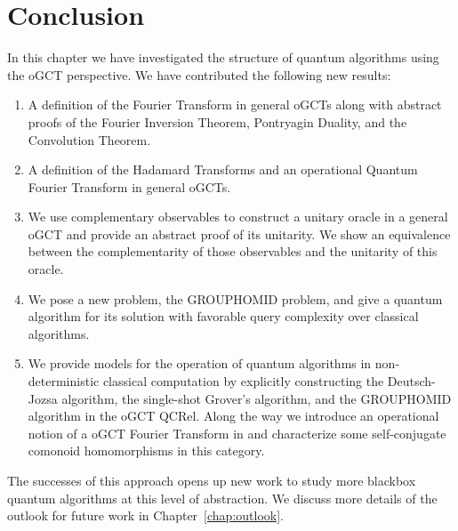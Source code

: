 \section{Conclusion}
In this chapter we have investigated the structure of quantum algorithms using the oGCT perspective. We have contributed the following new results:
\begin{enumerate}
\item A definition of the Fourier Transform in general oGCTs along with abstract proofs of the Fourier Inversion Theorem, Pontryagin Duality, and the Convolution Theorem.
\item A definition of the Hadamard Transforms and an operational Quantum Fourier Transform in general oGCTs.
\item We use complementary observables to construct a unitary oracle in a general oGCT and provide an abstract proof of its unitarity.  We show an equivalence between the complementarity of those observables and the unitarity of this oracle.
\item We pose a new problem, the GROUPHOMID problem, and give a quantum algorithm for its solution with favorable query complexity over classical algorithms.
\item We provide models for the operation of quantum algorithms in non-deterministic classical computation by explicitly constructing the Deutsch-Jozsa algorithm, the single-shot Grover's algorithm, and the GROUPHOMID algorithm in the oGCT QCRel. Along the way we introduce an operational notion of a oGCT Fourier Transform in  and characterize some self-conjugate comonoid homomorphisms in this category.
\end{enumerate}

The successes of this approach opens up new work to study more blackbox quantum algorithms at this level of abstraction. We discuss more details of the outlook for future work in Chapter~\ref{chap:outlook}. 

